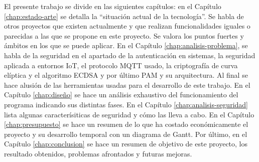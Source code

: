 El presente trabajo se divide en las siguientes capítulos: en el Capítulo \ref{chap:estado-arte} se detalla la ``situación actual de la 
tecnología''. Se habla de otros proyectos que existen actualmente y que realizan funcionalidades iguales o parecidas a las 
que se propone en este proyecto. Se valora los puntos fuertes y ámbitos en los que se puede aplicar. En el Capítulo \ref{chap:analisis-problema},
se habla de la seguridad en el apartado de la autenticación en sistemas, la seguridad aplicada a entornos IoT, el protocolo
MQTT usado, la criptografía de curva elíptica y el algoritmo ECDSA y por último PAM y su arquitectura. Al final se hace alusión
de las herramientas usadas para el desarrollo de este trabajo. En el Capítulo \ref{chap:diseño} se hace un análisis exhaustivo del 
funcionamiento del programa indicando sus distintas fases. En el Capítulo \ref{chap:analisis-seguridad} lista algunas caracterísiticas
de seguridad y cómo las lleva a cabo. En el Capítulo \ref{chap:presupuesto} se hace un resumen de lo que ha costado económicamente el 
proyecto y su desarrollo temporal con un diagrama de Gantt. Por último, en el Capítulo \ref{chap:conclusion} se hace un resumen de objetivo
de este proyecto, los resultado obtenidos, problemas afrontados y futuras mejoras.